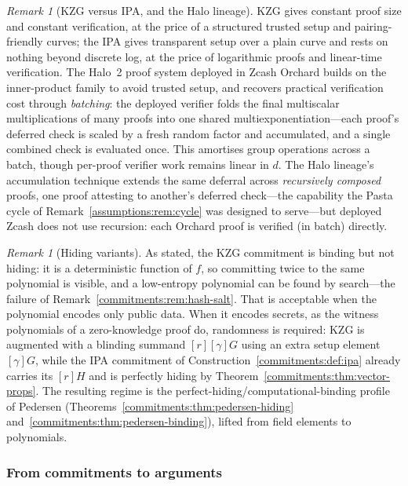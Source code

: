 \documentclass[11pt,a4paper]{article}
\theoremstyle{definition}
\theoremstyle{remark}
\newtheorem{remark}[theorem]{Remark}
\begin{document}
\begin{remark}[KZG versus IPA, and the Halo lineage]
\label{commitments:rem:kzg-vs-ipa}
KZG gives constant proof size and constant verification, at the price
of a structured trusted setup and pairing-friendly curves; the IPA
gives transparent setup over a plain curve and rests on nothing beyond
discrete log, at the price of logarithmic proofs and linear-time
verification. The Halo~2 proof system deployed in Zcash Orchard builds
on the inner-product family to avoid trusted setup, and recovers
practical verification cost through \emph{batching}: the deployed
verifier folds the final multiscalar multiplications of many proofs
into one shared multiexponentiation---each proof's deferred check is
scaled by a fresh random factor and accumulated, and a single
combined check is evaluated once. This amortises group operations
across a batch, though per-proof verifier work remains linear in
\(d\). The Halo lineage's accumulation technique extends
the same deferral across \emph{recursively composed} proofs, one
proof attesting to another's deferred check---the capability the
Pasta cycle of Remark~\ref{assumptions:rem:cycle} was designed to
serve---but deployed Zcash does not use recursion: each Orchard
proof is verified (in batch) directly.
\end{remark}

\begin{remark}[Hiding variants]\label{commitments:rem:pcs-hiding}
As stated, the KZG commitment is binding but not hiding: it is a
deterministic function of \(f\), so committing twice to the same
polynomial is visible, and a low-entropy polynomial can be found by
search---the failure of Remark~\ref{commitments:rem:hash-salt}. That
is acceptable when the polynomial encodes only public data. When it
encodes secrets, as the witness polynomials of a zero-knowledge proof
do, randomness is required: KZG is augmented with a blinding
summand \([r][\gamma]G\) using an extra setup element
\([\gamma]G\), while the IPA commitment of
Construction~\ref{commitments:def:ipa} already carries its \([r]H\)
and is perfectly hiding by
Theorem~\ref{commitments:thm:vector-props}. The resulting regime is
the perfect-hiding/computational-binding profile of Pedersen
(Theorems~\ref{commitments:thm:pedersen-hiding}
and~\ref{commitments:thm:pedersen-binding}), lifted from field
elements to polynomials.
\end{remark}

\subsubsection*{From commitments to arguments}
\end{document}
